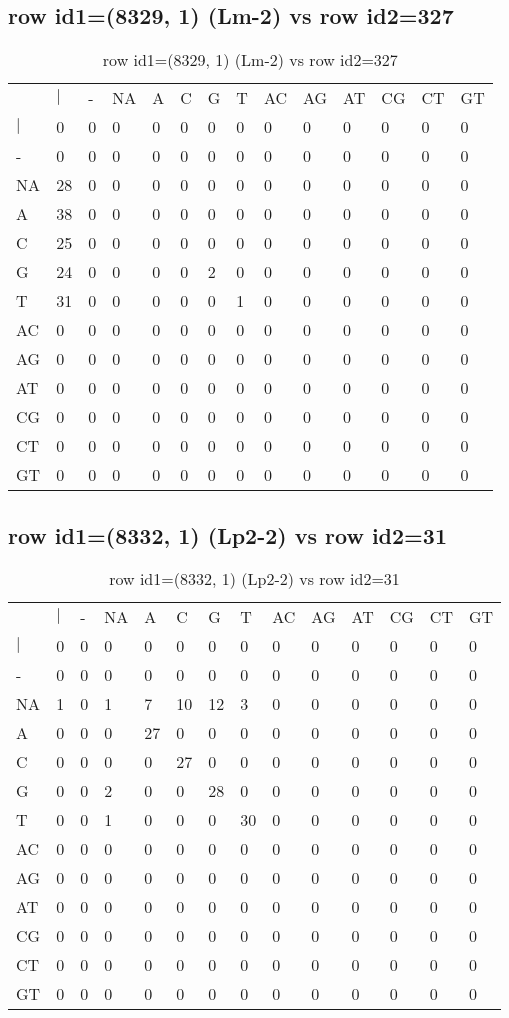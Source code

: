 \subsection{row id1=(8329, 1) (Lm-2) vs row id2=327}
\begin{center}
\begin{longtable}{|l|l|l|l|l|l|l|l|l|l|l|l|l|l|}
\caption{row id1=(8329, 1) (Lm-2) vs row id2=327} \label{table_dm334}\\
\hline
\\
\hline
&$|$&-&NA&A&C&G&T&AC&AG&AT&CG&CT&GT\\
$|$&0&0&0&0&0&0&0&0&0&0&0&0&0\\
-&0&0&0&0&0&0&0&0&0&0&0&0&0\\
NA&28&0&0&0&0&0&0&0&0&0&0&0&0\\
A&38&0&0&0&0&0&0&0&0&0&0&0&0\\
C&25&0&0&0&0&0&0&0&0&0&0&0&0\\
G&24&0&0&0&0&2&0&0&0&0&0&0&0\\
T&31&0&0&0&0&0&1&0&0&0&0&0&0\\
AC&0&0&0&0&0&0&0&0&0&0&0&0&0\\
AG&0&0&0&0&0&0&0&0&0&0&0&0&0\\
AT&0&0&0&0&0&0&0&0&0&0&0&0&0\\
CG&0&0&0&0&0&0&0&0&0&0&0&0&0\\
CT&0&0&0&0&0&0&0&0&0&0&0&0&0\\
GT&0&0&0&0&0&0&0&0&0&0&0&0&0\\
\hline
\end{longtable}
\end{center}

\subsection{row id1=(8332, 1) (Lp2-2) vs row id2=31}
\begin{center}
\begin{longtable}{|l|l|l|l|l|l|l|l|l|l|l|l|l|l|}
\caption{row id1=(8332, 1) (Lp2-2) vs row id2=31} \label{table_dm336}\\
\hline
\\
\hline
&$|$&-&NA&A&C&G&T&AC&AG&AT&CG&CT&GT\\
$|$&0&0&0&0&0&0&0&0&0&0&0&0&0\\
-&0&0&0&0&0&0&0&0&0&0&0&0&0\\
NA&1&0&1&7&10&12&3&0&0&0&0&0&0\\
A&0&0&0&27&0&0&0&0&0&0&0&0&0\\
C&0&0&0&0&27&0&0&0&0&0&0&0&0\\
G&0&0&2&0&0&28&0&0&0&0&0&0&0\\
T&0&0&1&0&0&0&30&0&0&0&0&0&0\\
AC&0&0&0&0&0&0&0&0&0&0&0&0&0\\
AG&0&0&0&0&0&0&0&0&0&0&0&0&0\\
AT&0&0&0&0&0&0&0&0&0&0&0&0&0\\
CG&0&0&0&0&0&0&0&0&0&0&0&0&0\\
CT&0&0&0&0&0&0&0&0&0&0&0&0&0\\
GT&0&0&0&0&0&0&0&0&0&0&0&0&0\\
\hline
\end{longtable}
\end{center}

